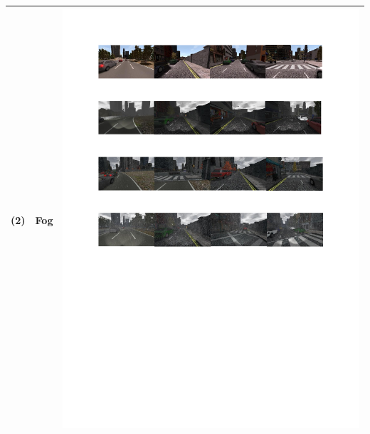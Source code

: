 \documentclass{svproc}
\begin{document}
\begin{table}[!t]
\begin{tabular}{|C{1.5cm}|c|C{8.5cm}|}
		(2) & Fog	& \begin{minipage}{.9\textwidth}\includegraphics[scale=.5,trim=2cm 20.5cm 2cm 6.5cm,clip]{examples.pdf}\end{minipage} \\ \hline

\end{tabular}
\end{table}
\end{document}
